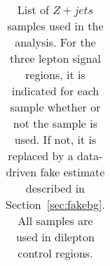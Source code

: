 \begin{table}[ht!]
\begin{footnotesize}
\begin{tabular}{c|c|c|c|c|c|c}
\hline 
\end{tabular}
  \end{footnotesize}

\caption{List of $Z+jets$ samples used in the analysis. 
For the three lepton signal regions, it is indicated for each
sample whether or not the sample is used.  If not, it is replaced
by a data-driven fake estimate described in Section~\ref{sec:fakebg}.
All samples are used in dilepton control regions.
}
\label{tab:sample_bkg_Zjets}
\end{table}

